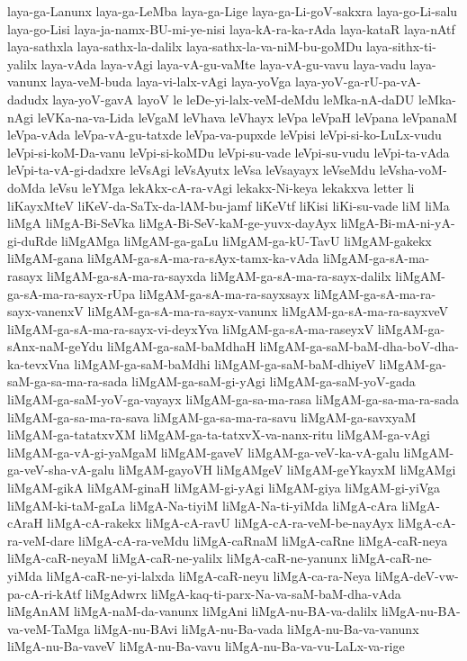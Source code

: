{laya-ga-Lanunx
laya-ga-LeMba
laya-ga-Lige
laya-ga-Li-goV-sakxra
laya-go-Li-salu
laya-go-Lisi
laya-ja-namx-BU-mi-ye-nisi
laya-kA-ra-ka-rAda
laya-kataR
laya-nAtf
laya-sathxla
laya-sathx-la-dalilx
laya-sathx-la-va-niM-bu-goMDu
laya-sithx-ti-yalilx
laya-vAda
laya-vAgi
laya-vA-gu-vaMte
laya-vA-gu-vavu
laya-vadu
laya-vanunx
laya-veM-buda
laya-vi-lalx-vAgi
laya-yoVga
laya-yoV-ga-rU-pa-vA-dadudx
laya-yoV-gavA
layoV
le
leDe-yi-lalx-veM-deMdu
leMka-nA-daDU
leMka-nAgi
leVKa-na-va-Lida
leVgaM
leVhava
leVhayx
leVpa
leVpaH
leVpana
leVpanaM
leVpa-vAda
leVpa-vA-gu-tatxde
leVpa-va-pupxde
leVpisi
leVpi-si-ko-LuLx-vudu
leVpi-si-koM-Da-vanu
leVpi-si-koMDu
leVpi-su-vade
leVpi-su-vudu
leVpi-ta-vAda
leVpi-ta-vA-gi-dadxre
leVsAgi
leVsAyutx
leVsa
leVsayayx
leVseMdu
leVsha-voM-doMda
leVsu
leYMga
lekAkx-cA-ra-vAgi
lekakx-Ni-keya
lekakxva
letter
li
liKayxMteV
liKeV-da-SaTx-da-lAM-bu-jamf
liKeVtf
liKisi
liKi-su-vade
liM
liMa
liMgA
liMgA-Bi-SeVka
liMgA-Bi-SeV-kaM-ge-yuvx-dayAyx
liMgA-Bi-mA-ni-yA-gi-duRde
liMgAMga
liMgAM-ga-gaLu
liMgAM-ga-kU-TavU
liMgAM-gakekx
liMgAM-gana
liMgAM-ga-sA-ma-ra-sAyx-tamx-ka-vAda
liMgAM-ga-sA-ma-rasayx
liMgAM-ga-sA-ma-ra-sayxda
liMgAM-ga-sA-ma-ra-sayx-dalilx
liMgAM-ga-sA-ma-ra-sayx-rUpa
liMgAM-ga-sA-ma-ra-sayxsayx
liMgAM-ga-sA-ma-ra-sayx-vanenxV
liMgAM-ga-sA-ma-ra-sayx-vanunx
liMgAM-ga-sA-ma-ra-sayxveV
liMgAM-ga-sA-ma-ra-sayx-vi-deyxYva
liMgAM-ga-sA-ma-raseyxV
liMgAM-ga-sAnx-naM-geYdu
liMgAM-ga-saM-baMdhaH
liMgAM-ga-saM-baM-dha-boV-dha-ka-tevxVna
liMgAM-ga-saM-baMdhi
liMgAM-ga-saM-baM-dhiyeV
liMgAM-ga-saM-ga-sa-ma-ra-sada
liMgAM-ga-saM-gi-yAgi
liMgAM-ga-saM-yoV-gada
liMgAM-ga-saM-yoV-ga-vayayx
liMgAM-ga-sa-ma-rasa
liMgAM-ga-sa-ma-ra-sada
liMgAM-ga-sa-ma-ra-sava
liMgAM-ga-sa-ma-ra-savu
liMgAM-ga-savxyaM
liMgAM-ga-tatatxvXM
liMgAM-ga-ta-tatxvX-va-nanx-ritu
liMgAM-ga-vAgi
liMgAM-ga-vA-gi-yaMgaM
liMgAM-gaveV
liMgAM-ga-veV-ka-vA-galu
liMgAM-ga-veV-sha-vA-galu
liMgAM-gayoVH
liMgAMgeV
liMgAM-geYkayxM
liMgAMgi
liMgAM-gikA
liMgAM-ginaH
liMgAM-gi-yAgi
liMgAM-giya
liMgAM-gi-yiVga
liMgAM-ki-taM-gaLa
liMgA-Na-tiyiM
liMgA-Na-ti-yiMda
liMgA-cAra
liMgA-cAraH
liMgA-cA-rakekx
liMgA-cA-ravU
liMgA-cA-ra-veM-be-nayAyx
liMgA-cA-ra-veM-dare
liMgA-cA-ra-veMdu
liMgA-caRnaM
liMgA-caRne
liMgA-caR-neya
liMgA-caR-neyaM
liMgA-caR-ne-yalilx
liMgA-caR-ne-yanunx
liMgA-caR-ne-yiMda
liMgA-caR-ne-yi-lalxda
liMgA-caR-neyu
liMgA-ca-ra-Neya
liMgA-deV-vw-pa-cA-ri-kAtf
liMgAdwrx
liMgA-kaq-ti-parx-Na-va-saM-baM-dha-vAda
liMgAnAM
liMgA-naM-da-vanunx
liMgAni
liMgA-nu-BA-va-dalilx
liMgA-nu-BA-va-veM-TaMga
liMgA-nu-BAvi
liMgA-nu-Ba-vada
liMgA-nu-Ba-va-vanunx
liMgA-nu-Ba-vaveV
liMgA-nu-Ba-vavu
liMgA-nu-Ba-va-vu-LaLx-va-rige
}
